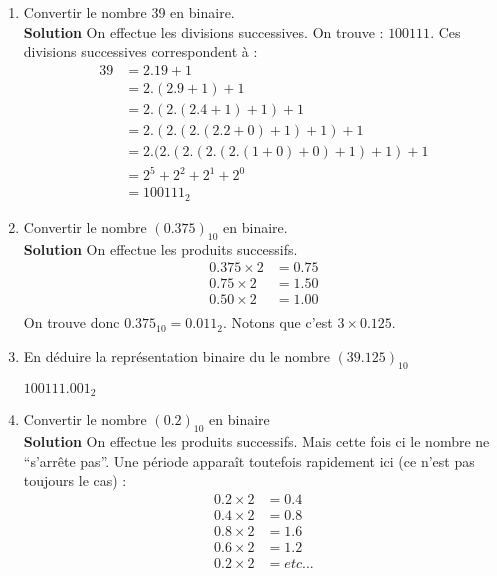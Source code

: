 \documentclass[a4paper,11pt]{article}
\begin{document}
\begin{enumerate}
\item Convertir le nombre 39 en binaire.\\

{\bf Solution} On effectue les divisions successives. On trouve : $100111$.
Ces divisions successives correspondent à :
\begin{align}
  39 &= 2.19+1 \nonumber \\
     &= 2.(2.9+1)+1 \nonumber \\
     &= 2.(2.(2.4+1)+1)+1\nonumber \\
     &= 2.(2.(2.(2.2+0)+1)+1)+1\nonumber \\
     &= 2.(2.(2.(2.(2.(1+0)+0)+1)+1)+1\nonumber \\
     &= 2^5+2^2 +2^1+ 2^0\nonumber \\
     &= 100111_2 \nonumber
\end{align}


\item Convertir le nombre $(0.375 )_{10}$ en binaire.\\
{\bf Solution} On effectue les produits successifs.
\begin{align}
  0.375 \times 2 &= 0.75 \nonumber \\
  0.75 \times 2  &= 1.50 \nonumber \\
  0.50 \times 2  &= 1.00 \nonumber \\
\end{align}
On trouve donc $0.375_{10}=0.011_{2}$. Notons que c'est $3\times 0.125$.

\item En déduire la représentation binaire du le nombre $( 39.125 )_{10}$

$100111.001_{2}$

\item Convertir le nombre $( 0.2)_{10}$ en binaire\\

{\bf Solution} On effectue les produits successifs. Mais cette fois ci le nombre ne ``s'arrête pas''. Une période apparaît toutefois rapidement ici (ce n'est pas toujours le cas) :
\begin{align}
     0.2\times 2 &= 0.4 \nonumber \\
     0.4\times 2 &= 0.8 \nonumber \\
     0.8\times 2 &= 1.6 \nonumber \\
     0.6\times 2 &= 1.2 \nonumber \\
     0.2\times 2 &= etc...
\end{align}


\end{enumerate}
\end{document}
